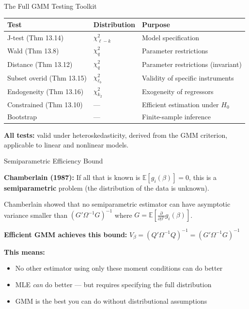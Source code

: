 \documentclass[aspectratio=169, handout]{beamer}
\numberwithin{equation}{section}
\begin{document}
\begin{frame}{The Full GMM Testing Toolkit}

\begin{table}[h]
\centering
\small
\begin{tabular}{p{3.5cm}lp{3.5cm}}
\toprule
\textbf{Test} & \textbf{Distribution} & \textbf{Purpose} \\
\midrule
J-test (Thm 13.14) & $\chi^2_{\ell-k}$ & Model specification \\[2pt]
Wald (Thm 13.8) & $\chi^2_q$ & Parameter restrictions \\[2pt]
Distance (Thm 13.12) & $\chi^2_q$ & Parameter restrictions (invariant) \\[2pt]
Subset overid (Thm 13.15) & $\chi^2_{\ell_b}$ & Validity of specific instruments \\[2pt]
Endogeneity (Thm 13.16) & $\chi^2_{k_2}$ & Exogeneity of regressors \\[2pt]
Constrained (Thm 13.10) & --- & Efficient estimation under $H_0$ \\[2pt]
Bootstrap & --- & Finite-sample inference \\
\bottomrule
\end{tabular}
\end{table}

\smallskip
\textbf{All tests:} valid under heteroskedasticity, derived from the GMM criterion, applicable to linear and nonlinear models.

\end{frame}

\begin{frame}{Semiparametric Efficiency Bound}

\textbf{Chamberlain (1987):} If all that is known is $\mathbb{E}[g_i(\beta)] = 0$, this is a \textbf{semiparametric} problem (the distribution of the data is unknown).

\medskip
Chamberlain showed that no semiparametric estimator can have asymptotic variance smaller than $(G'\Omega^{-1}G)^{-1}$ where $G = \mathbb{E}\!\left[\frac{\partial}{\partial \beta'}g_i(\beta)\right]$.

\medskip
\textbf{Efficient GMM achieves this bound:} $V_\beta = (Q'\Omega^{-1}Q)^{-1} = (G'\Omega^{-1}G)^{-1}$

\medskip
\begin{tcolorbox}[colback=blue!5, colframe=blue!50]
\textbf{This means:}
\begin{itemize}
\item No other estimator using only these moment conditions can do better
\item MLE \textit{can} do better --- but requires specifying the full distribution
\item GMM is the best you can do without distributional assumptions
\end{itemize}
\end{tcolorbox}

\end{frame}
\end{document}

